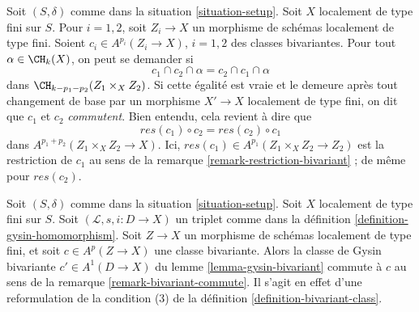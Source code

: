 \begin{remark}
\label{remark-bivariant-commute}
Soit $(S, \delta)$ comme dans la situation \ref{situation-setup}. Soit $X$
localement de type fini sur $S$. Pour $i = 1, 2$, soit $Z_i \to X$
un morphisme de schémas localement de type fini. Soient
$c_i \in A^{p_i}(Z_i \to X)$, $i = 1, 2$ des classes bivariantes.
Pour tout $\alpha \in \CH_k(X)$, on peut se demander si
$$
c_1 \cap c_2 \cap \alpha = c_2 \cap c_1 \cap \alpha
$$
dans $\CH_{k - p_1 - p_2}(Z_1 \times_X Z_2)$. Si cette égalité est vraie et le demeure
après tout changement de base par un morphisme $X' \to X$ localement de type fini, on dit
que $c_1$ et $c_2$ {\it commutent}. Bien entendu, cela revient à dire que
$$
res(c_1) \circ c_2 = res(c_2) \circ c_1
$$
dans $A^{p_1 + p_2}(Z_1 \times_X Z_2 \to X)$. Ici,
$res(c_1) \in A^{p_1}(Z_1 \times_X Z_2 \to Z_2)$ est la restriction de $c_1$
au sens de la remarque \ref{remark-restriction-bivariant} ; de même pour $res(c_2)$.
\end{remark}

\begin{example}
\label{example-gysin-commute}
Soit $(S, \delta)$ comme dans la situation \ref{situation-setup}. Soit $X$ localement
de type fini sur $S$. Soit $(\mathcal{L}, s, i : D \to X)$ un triplet comme dans la
définition \ref{definition-gysin-homomorphism}. Soit $Z \to X$ un morphisme
de schémas localement de type fini, et soit $c \in A^p(Z \to X)$ une
classe bivariante. Alors la classe de Gysin bivariante $c' \in A^1(D \to X)$ du
lemme \ref{lemma-gysin-bivariant} commute à $c$ au sens de la
remarque \ref{remark-bivariant-commute}. Il s'agit en effet d'une reformulation de la
condition (3) de la définition \ref{definition-bivariant-class}.
\end{example}

